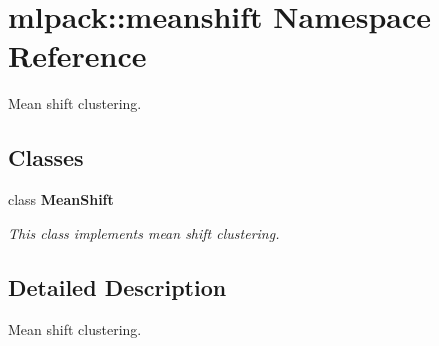 \section{mlpack\+:\+:meanshift Namespace Reference}
\label{namespacemlpack_1_1meanshift}


Mean shift clustering.  


\subsection*{Classes}
\begin{DoxyCompactItemize}
\item 
class {\bf Mean\+Shift}
\begin{DoxyCompactList}\small\item\em This class implements mean shift clustering. \end{DoxyCompactList}\end{DoxyCompactItemize}


\subsection{Detailed Description}
Mean shift clustering. 

